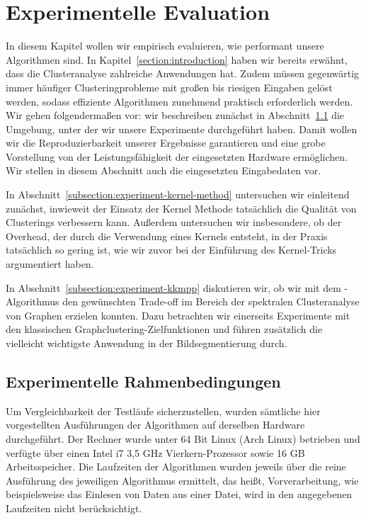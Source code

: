\section{Experimentelle Evaluation}
\label{section:experiments}

In diesem Kapitel wollen wir empirisch evaluieren, wie performant unsere Algorithmen sind. In Kapitel~\ref{section:introduction}
haben wir bereits erwähnt, dass die Clusteranalyse zahlreiche Anwendungen hat. Zudem müssen gegenwärtig immer häufiger
Clusteringprobleme mit großen bis riesigen Eingaben gelöst werden, sodass effiziente Algorithmen zunehmend praktisch erforderlich
werden.
\absatz
Wir gehen folgendermaßen vor: wir beschreiben zunächst in Abschnitt~\ref{subsection:experiment-environment} die Umgebung, unter
der wir unsere Experimente durchgeführt haben. Damit wollen wir die Reproduzierbarkeit unserer Ergebnisse garantieren und eine
grobe Vorstellung von der Leistungsfähigkeit der eingesetzten Hardware ermöglichen. Wir stellen in diesem Abschnitt auch 
die eingesetzten Eingabedaten vor.

In Abschnitt~\ref{subsection:experiment-kernel-method} untersuchen wir einleitend zunächst, inwieweit der Einsatz der Kernel
Methode tatsächlich die Qualität von Clusterings verbessern kann. Außerdem untersuchen wir insbesondere, ob der Overhead,
der durch die Verwendung eines Kernels entsteht, in der Praxis tatsächlich so gering ist, wie wir zuvor bei der Einführung des
Kernel-Tricks argumentiert haben.

In Abschnitt~\ref{subsection:experiment-kkmpp} diskutieren wir, ob wir mit dem \kkmpp-Algorithmus den gewünschten Trade-off im
Bereich der spektralen Clusteranalyse von Graphen erzielen konnten. Dazu betrachten wir einerseits Experimente mit den klassischen
Graphclustering-Zielfunktionen und führen zusätzlich die vielleicht wichtigste Anwendung in der Bildsegmentierung durch.

\subsection{Experimentelle Rahmenbedingungen}
\label{subsection:experiment-environment}

Um Vergleichbarkeit der Testläufe sicherzustellen, wurden sämtliche hier vorgestellten Ausführungen der Algorithmen auf derselben
Hardware durchgeführt. Der Rechner wurde unter 64 Bit Linux (Arch Linux) betrieben und verfügte über einen
Intel i7 3,5 GHz Vierkern-Prozessor sowie 16 GB Arbeitsspeicher. Die Laufzeiten der Algorithmen wurden jeweils über die reine
Ausführung des jeweiligen Algorithmus ermittelt, das heißt, Vorverarbeitung, wie beispielsweise das Einlesen von Daten aus einer
Datei, wird in den angegebenen Laufzeiten nicht berücksichtigt.

